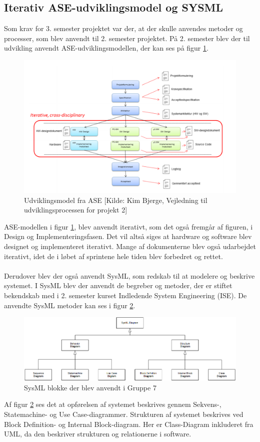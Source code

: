 \documentclass[Rapport/Rapport_main.tex]{subfiles}
\begin{document}
\subsection{Iterativ ASE-udviklingsmodel og SYSML}
Som krav for 3. semester projektet var der, at der skulle anvendes metoder og processer, som blev anvendt til 2. semester projektet. På 2. semester blev der til udvikling anvendt ASE-udviklingsmodellen, der kan ses på figur \ref{fig:rap_ase_model}.
\begin{figure}[H]
    \centering
    \includegraphics[width=\textwidth]{Processdokument/graphics/ASE_model.png}
    \caption{Udviklingsmodel fra ASE [Kilde: Kim Bjerge, Vejledning til udviklingsprocessen for projekt 2\cite{}]}
    \label{fig:rap_ase_model}
\end{figure}
ASE-modellen i figur \ref{fig:rap_ase_model}, blev anvendt iterativt, som det også fremgår af figuren, i Design og Implementeringsfasen. Det vil altså siges at hardware og software blev designet og implementeret iterativt. Mange af dokumenterne blev også udarbejdet iterativt, idet de i løbet af sprintene hele tiden blev forbedret og rettet.\\\\
Derudover blev der også anvendt SysML, som redskab til at modelere og beskrive systemet. I SysML blev der anvendt de begreber og metoder, der er stiftet bekendskab med i 2. semester kurset Indledende System Engineering (ISE). De anvendte SysML metoder kan ses i figur \ref{fig:rap_sysml_usage}.
\begin{figure}[H]
    \centering
    \includegraphics[width=\textwidth]{Processdokument/graphics/Sysml_usage.png}
    \caption{SysML blokke der blev anvendt i Gruppe 7}
    \label{fig:rap_sysml_usage}
\end{figure}
Af figur \ref{fig:rap_sysml_usage} ses det at opførelsen af systemet beskrives gennem Sekvens-, Statemachine- og Use Case-diagrammer.
Strukturen af systemet beskrives ved Block Definition- og Internal Block-diagram. Her er Class-Diagram inkluderet fra UML, da den beskriver strukturen og relationerne i software.
\end{document}

